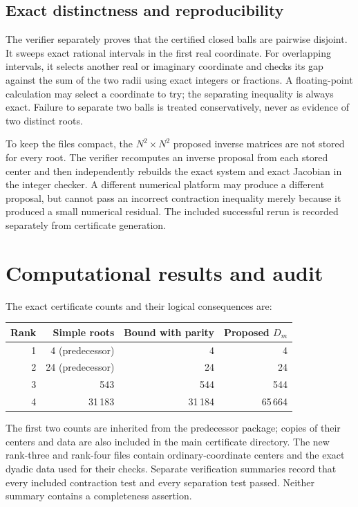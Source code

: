 \documentclass[11pt]{article}
\theoremstyle{remark}\newtheorem{remark}[theorem]{Remark}
\newcommand{\rankfourroots}{31\,183}
\newcommand{\rankfourbound}{31\,184}
\newcommand{\rankthreeroots}{543}
\begin{document}
\subsection{Exact distinctness and reproducibility}
The verifier separately proves that the certified closed balls are pairwise disjoint. It sweeps exact rational intervals in the first real coordinate. For overlapping intervals, it selects another real or imaginary coordinate and checks its gap against the sum of the two radii using exact integers or fractions. A floating-point calculation may select a coordinate to try; the separating inequality is always exact. Failure to separate two balls is treated conservatively, never as evidence of two distinct roots.

To keep the files compact, the $N^2\times N^2$ proposed inverse matrices are not stored for every root. The verifier recomputes an inverse proposal from each stored center and then independently rebuilds the exact system and exact Jacobian in the integer checker. A different numerical platform may produce a different proposal, but cannot pass an incorrect contraction inequality merely because it produced a small numerical residual. The included successful rerun is recorded separately from certificate generation.

\section{Computational results and audit}\label{sec:audit}
The exact certificate counts and their logical consequences are:
\begin{center}
\begin{tabular}{@{}rrrr@{}}\toprule
Rank & Simple roots & Bound with parity & Proposed $D_m$\\\midrule
1 & 4 (predecessor) & 4 & 4\\
2 & 24 (predecessor) & 24 & 24\\
3 & \rankthreeroots & 544 & 544\\
4 & \rankfourroots & \rankfourbound & 65\,664\\\bottomrule
\end{tabular}
\end{center}
The first two counts are inherited from the predecessor package; copies of their centers and data are also included in the main certificate directory. The new rank-three and rank-four files contain ordinary-coordinate centers and the exact dyadic data used for their checks. Separate verification summaries record that every included contraction test and every separation test passed. Neither summary contains a completeness assertion.
\end{document}
